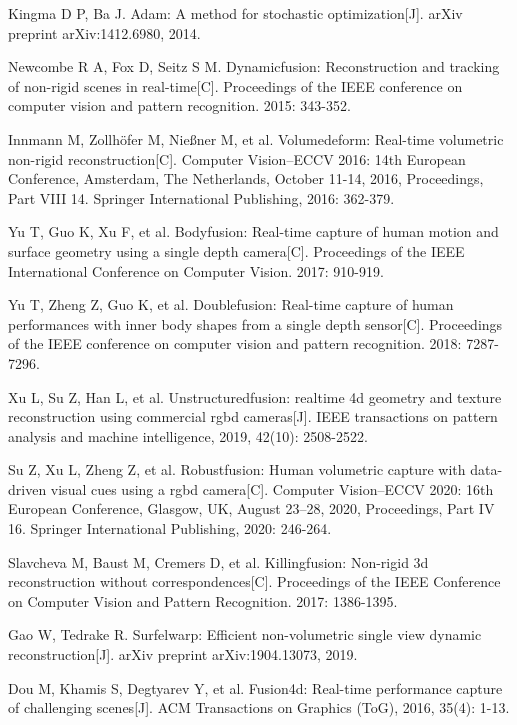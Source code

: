 Kingma D P, Ba J. Adam: A method for stochastic optimization[J]. arXiv preprint arXiv:1412.6980, 2014.

 Newcombe R A, Fox D, Seitz S M. Dynamicfusion: Reconstruction and tracking of non-rigid scenes in real-time[C]. Proceedings of the IEEE conference on computer vision and pattern recognition. 2015: 343-352.

 Innmann M, Zollhöfer M, Nießner M, et al. Volumedeform: Real-time volumetric non-rigid reconstruction[C]. Computer Vision–ECCV 2016: 14th European Conference, Amsterdam, The Netherlands, October 11-14, 2016, Proceedings, Part VIII 14. Springer International Publishing, 2016: 362-379.

Yu T, Guo K, Xu F, et al. Bodyfusion: Real-time capture of human motion and surface geometry using a single depth camera[C]. Proceedings of the IEEE International Conference on Computer Vision. 2017: 910-919.

Yu T, Zheng Z, Guo K, et al. Doublefusion: Real-time capture of human performances with inner body shapes from a single depth sensor[C]. Proceedings of the IEEE conference on computer vision and pattern recognition. 2018: 7287-7296.

Xu L, Su Z, Han L, et al. Unstructuredfusion: realtime 4d geometry and texture reconstruction using commercial rgbd cameras[J]. IEEE transactions on pattern analysis and machine intelligence, 2019, 42(10): 2508-2522.

 Su Z, Xu L, Zheng Z, et al. Robustfusion: Human volumetric capture with data-driven visual cues using a rgbd camera[C]. Computer Vision–ECCV 2020: 16th European Conference, Glasgow, UK, August 23–28, 2020, Proceedings, Part IV 16. Springer International Publishing, 2020: 246-264.


Slavcheva M, Baust M, Cremers D, et al. Killingfusion: Non-rigid 3d reconstruction without correspondences[C]. Proceedings of the IEEE Conference on Computer Vision and Pattern Recognition. 2017: 1386-1395.

Gao W, Tedrake R. Surfelwarp: Efficient non-volumetric single view dynamic reconstruction[J]. arXiv preprint arXiv:1904.13073, 2019.

Dou M, Khamis S, Degtyarev Y, et al. Fusion4d: Real-time performance capture of challenging scenes[J]. ACM Transactions on Graphics (ToG), 2016, 35(4): 1-13.

